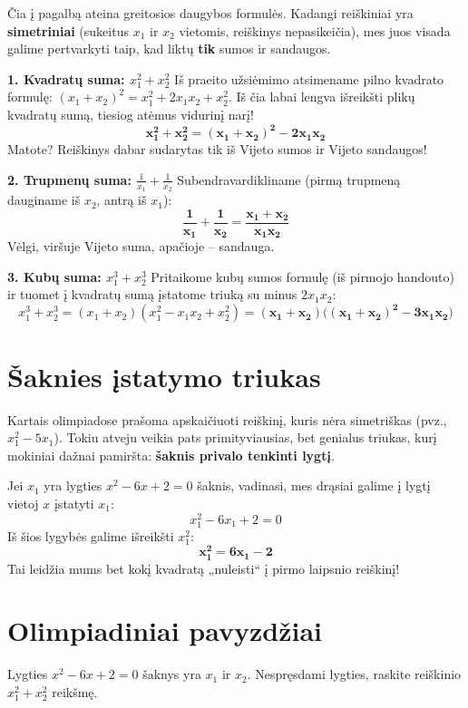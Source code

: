 \documentclass[11pt,a4paper]{scrartcl}
\begin{document}
Čia į pagalbą ateina greitosios daugybos formulės. Kadangi reiškiniai yra \textbf{simetriniai} (sukeitus $x_1$ ir $x_2$ vietomis, reiškinys nepasikeičia), mes juos visada galime pertvarkyti taip, kad liktų \textbf{tik} sumos ir sandaugos.

\textbf{1. Kvadratų suma: $x_1^2 + x_2^2$}
Iš praeito užsiėmimo atsimename pilno kvadrato formulę: $(x_1 + x_2)^2 = x_1^2 + 2x_1x_2 + x_2^2$.
Iš čia labai lengva išreikšti plikų kvadratų sumą, tiesiog atėmus vidurinį narį!
\[ \mathbf{x_1^2 + x_2^2 = (x_1 + x_2)^2 - 2x_1x_2} \]
Matote? Reiškinys dabar sudarytas tik iš Vijeto sumos ir Vijeto sandaugos!

\textbf{2. Trupmenų suma: $\frac{1}{x_1} + \frac{1}{x_2}$}
Subendravardikliname (pirmą trupmeną dauginame iš $x_2$, antrą iš $x_1$):
\[ \mathbf{\frac{1}{x_1} + \frac{1}{x_2} = \frac{x_1 + x_2}{x_1 x_2}} \]
Vėlgi, viršuje Vijeto suma, apačioje – sandauga.

\textbf{3. Kubų suma: $x_1^3 + x_2^3$}
Pritaikome kubų sumos formulę (iš pirmojo handouto) ir tuomet į kvadratų sumą įstatome triuką su minus $2x_1x_2$:
\[ x_1^3 + x_2^3 = (x_1 + x_2)(x_1^2 - x_1x_2 + x_2^2) = \mathbf{(x_1 + x_2)\big((x_1 + x_2)^2 - 3x_1x_2\big)} \]

\section{Šaknies įstatymo triukas}

Kartais olimpiadose prašoma apskaičiuoti reiškinį, kuris nėra simetriškas (pvz., $x_1^2 - 5x_1$). Tokiu atveju veikia pats primityviausias, bet genialus triukas, kurį mokiniai dažnai pamiršta: \textbf{šaknis privalo tenkinti lygtį}.

Jei $x_1$ yra lygties $x^2 - 6x + 2 = 0$ šaknis, vadinasi, mes drąsiai galime į lygtį vietoj $x$ įstatyti $x_1$:
\[ x_1^2 - 6x_1 + 2 = 0 \]
Iš šios lygybės galime išreikšti $x_1^2$:
\[ \mathbf{x_1^2 = 6x_1 - 2} \]
Tai leidžia mums bet kokį kvadratą „nuleisti“ į pirmo laipsnio reiškinį!

\section{Olimpiadiniai pavyzdžiai}

\begin{example}
Lygties $x^2 - 6x + 2 = 0$ šaknys yra $x_1$ ir $x_2$. Nespręsdami lygties, raskite reiškinio $x_1^2 + x_2^2$ reikšmę.
\end{example}
\end{document}
